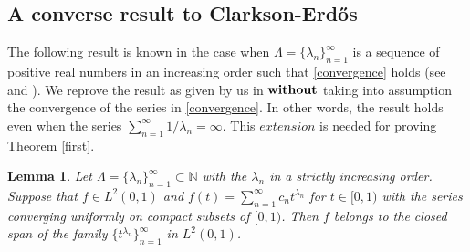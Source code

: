 \documentclass[11pt, a4paper]{article}
\newtheorem{lemma}{Lemma}[section]
\begin{document}
\subsection{A converse result to Clarkson-Erd\H{o}s}

The following result is known  in the case when $\Lambda=\{\lambda_n\}_{n=1}^{\infty}$ is a sequence of
positive real numbers in an increasing order such that \eqref{convergence} holds (see \cite[Corollary 6.2.4]{Gurariy} and \cite[Lemma 1]{Zikkos2026Acta}).  We reprove the result as given by us
in \cite[Lemma 1]{Zikkos2026Acta} $\bf without$ taking into assumption the convergence of the series in \eqref{convergence}.
In other words, the result holds even when the series $\sum_{n=1}^{\infty} 1/\lambda_n=\infty$. This $extension$ is needed for proving
Theorem \ref{first}.

\begin{lemma}\label{converse}
Let $\Lambda=\{\lambda_n\}_{n=1}^{\infty}\subset\mathbb{N}$ with the $\lambda_n$ in a strictly increasing order.
Suppose that $f\in L^2 (0,1)$ and $f(t)=\sum_{n=1}^{\infty} c_n t^{\lambda_n}$ for $t\in [0,1)$ with the series converging uniformly on compact
subsets of $[0, 1)$. Then $f$ belongs to the closed span of the family $\{t^{\lambda_n}\}_{n=1}^{\infty}$ in $L^2 (0,1)$.
\end{lemma}
\end{document}
